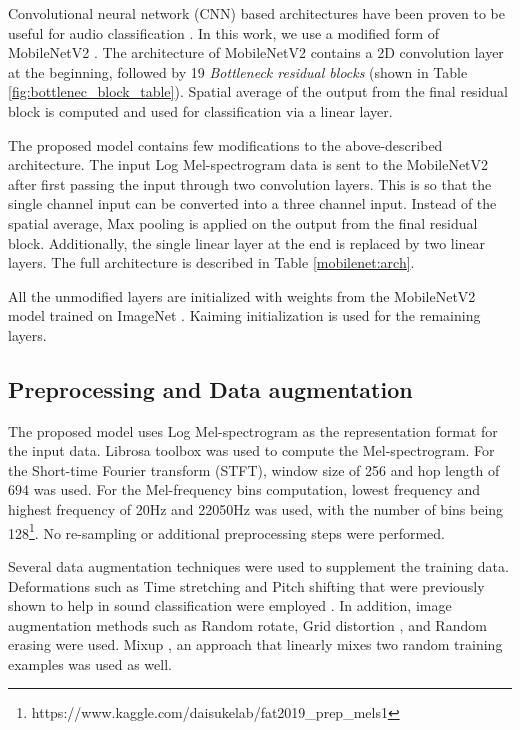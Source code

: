 \documentclass{article}
\begin{document}
\begin{sloppy}
Convolutional neural network (CNN) based architectures have been proven to be useful for audio classification \cite{hershey2017cnn, salamon2017deep}. In this work, we use a modified form of MobileNetV2 \cite{sandler2018mobilenetv2}. The architecture of MobileNetV2 contains a 2D convolution layer at the beginning, followed by 19 \textit{Bottleneck residual blocks} (shown in Table \ref{fig:bottlenec_block_table}). Spatial average of the output from the final residual block is computed and used for classification via a linear layer.

The proposed model contains few modifications to the above-described architecture. The input Log Mel-spectrogram data is sent to the MobileNetV2 after first passing the input through two convolution layers. This is so that the single channel input can be converted into a three channel input. Instead of the spatial average, Max pooling is applied on the output from the final residual block. Additionally, the single linear layer at the end is replaced by two linear layers. The full architecture is described in Table \ref{mobilenet:arch}.

All the unmodified layers are initialized with weights from the MobileNetV2 model trained on ImageNet \cite{mv2weights}. Kaiming initialization \cite{he2015delving} is used for the remaining layers.


\subsection{Preprocessing and Data augmentation}
\label{ssec:preprocessing}

The proposed model uses Log Mel-spectrogram as the representation format for the input data. Librosa \cite{brian_mcfee_2019_2564164} toolbox was used to compute the Mel-spectrogram. For the Short-time Fourier transform (STFT), window size of 256 and hop length of 694 was used. For the Mel-frequency bins computation, lowest frequency and highest frequency of 20Hz and 22050Hz was used, with the number of bins being 128\footnote{https://www.kaggle.com/daisukelab/fat2019\_prep\_mels1}. No re-sampling or additional preprocessing steps were performed.

Several data augmentation techniques were used to supplement the training data. Deformations such as Time stretching and Pitch shifting that were previously shown to help in sound classification were employed \cite{salamon2017deep}. In addition, image augmentation methods such as Random rotate, Grid distortion \cite{2018arXiv180906839B}, and Random erasing \cite{zhong2017random} were used. Mixup \cite{zhang2017mixup}, an approach that linearly mixes two random training examples was used as well.


\end{sloppy}
\end{document}
